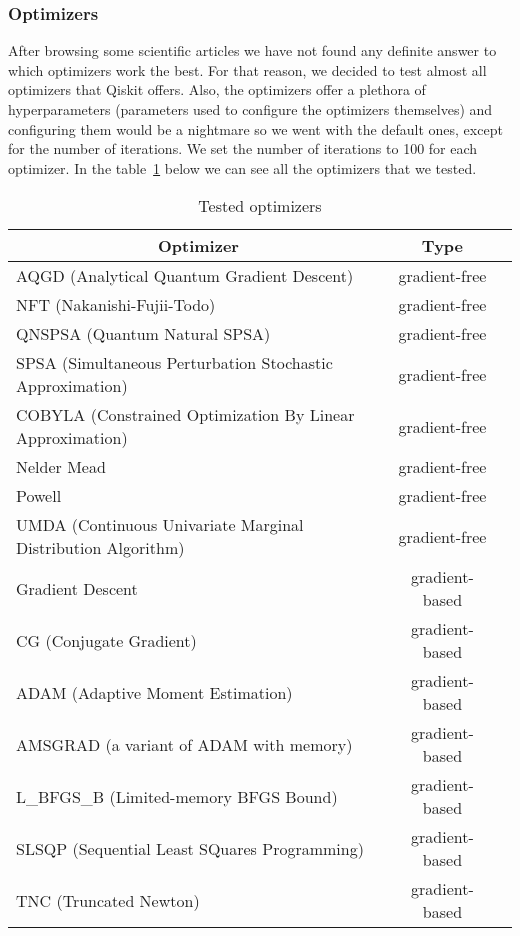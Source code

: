 \subsubsection{Optimizers}
After browsing some scientific articles we have not found any definite answer to which optimizers work the best. For that reason, we decided to test almost all optimizers that Qiskit offers.  Also, the optimizers offer a plethora of hyperparameters (parameters used to configure the optimizers themselves) and configuring them would be a nightmare so we went with the default ones, except for the number of iterations. We set the number of iterations to 100 for each optimizer. In the table~\ref{tab:optimizers} below we can see all the optimizers that we tested.

\begin{table}[H]
    \centering
    \begin{tabular}{|l|c|c|} 
        \hline
        \multicolumn{1}{|c|}{\textbf{Optimizer}} & \textbf{Type}\\
        \hline
        AQGD (Analytical Quantum Gradient Descent) & gradient-free \\ 
        \hline
        NFT (Nakanishi-Fujii-Todo) & gradient-free \\ 
        \hline
        QNSPSA (Quantum Natural SPSA) & gradient-free \\ 
        \hline
        SPSA (Simultaneous Perturbation Stochastic Approximation) & gradient-free \\ 
        \hline
        COBYLA (Constrained Optimization By Linear Approximation) & gradient-free \\ 
        \hline
        Nelder Mead & gradient-free \\ 
        \hline
        Powell & gradient-free \\ 
        \hline
        UMDA (Continuous Univariate Marginal Distribution Algorithm) & gradient-free \\ 
        \hline
        Gradient Descent & gradient-based \\ 
        \hline
        CG (Conjugate Gradient) & gradient-based \\ 
        \hline
        ADAM (Adaptive Moment Estimation) & gradient-based \\ 
        \hline
        AMSGRAD (a variant of ADAM with memory) & gradient-based \\ 
        \hline
        L\_BFGS\_B (Limited-memory BFGS Bound)  & gradient-based \\ 
        \hline
        SLSQP (Sequential Least SQuares Programming)  & gradient-based \\ 
        \hline
        TNC (Truncated Newton)  & gradient-based \\ 
        \hline
    \end{tabular}
    \caption{Tested optimizers}
    \label{tab:optimizers}
\end{table}

